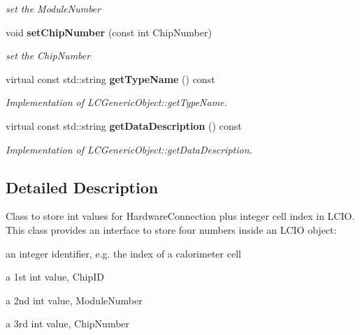 \begin{DoxyCompactItemize}
\begin{DoxyCompactList}\small\item\em set the ModuleNumber \item\end{DoxyCompactList}\item 
void {\bf setChipNumber} (const int ChipNumber)\label{classCALICE_1_1Ahc2HardwareConnection_aeee207bd52c55f7499f8fc5cceed2720}

\begin{DoxyCompactList}\small\item\em set the ChipNumber \item\end{DoxyCompactList}\item 
virtual const std::string {\bf getTypeName} () const \label{classCALICE_1_1Ahc2HardwareConnection_aca4aa2ddf56a2022029fbef9f28e17a2}

\begin{DoxyCompactList}\small\item\em Implementation of LCGenericObject::getTypeName. \item\end{DoxyCompactList}\item 
virtual const std::string {\bf getDataDescription} () const \label{classCALICE_1_1Ahc2HardwareConnection_a08a33f99895fb19ab59d07d6e3b46e3e}

\begin{DoxyCompactList}\small\item\em Implementation of LCGenericObject::getDataDescription. \item\end{DoxyCompactList}\end{DoxyCompactItemize}


\subsection{Detailed Description}
Class to store int values for HardwareConnection plus integer cell index in LCIO. This class provides an interface to store four numbers inside an LCIO object:
\begin{DoxyItemize}
\item an integer identifier, e.g. the index of a calorimeter cell
\item a 1st int value, ChipID
\item a 2nd int value, ModuleNumber
\item a 3rd int value, ChipNumber
\end{DoxyItemize}


